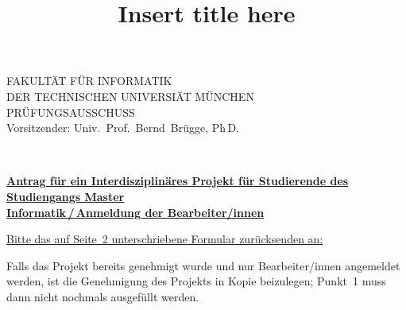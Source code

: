 \documentclass[german,11pt,a4paper]{netforms}
\title{Insert title here}{Titel hier eintragen}
\begin{document}
	\begin{minipage}{.2\textwidth}%
		\centering
	\end{minipage}%
	\begin{minipage}{.6\textwidth}%
		\centering
		\huge\textsc{FAKULT\"AT F\"UR INFORMATIK}\large\\[-.2ex]
		\textsc{DER TECHNISCHEN UNIVERSI\"AT M\"UNCHEN}\\[-.2ex]
		\textsc{PR\"UFUNGSAUSSCHUSS}\\[-.2ex]
		Vorsitzender: Univ.~Prof.~Bernd~Br\"ugge, Ph\,D.
	\end{minipage}%
	\begin{minipage}{.2\textwidth}%
		\centering
	\end{minipage}\\[1ex]

	\begin{center}
		\textbf{%
			\large
			\underline{Antrag f\"ur ein Interdisziplin\"ares Projekt f\"ur
			Studierende des Studiengangs Master}\\[.2ex]
			\underline{Informatik\,/\,Anmeldung der Bearbeiter/innen}
		}
	\end{center}

	\vspace{1ex}
	{%
		\footnotesize
		\underline{Bitte das auf Seite~2 unterschriebene Formular
		zur\"ucksenden an:}
	}

	\vspace{.5ex}
	\hspace{.5ex}

	\vspace{\baselineskip}
	Falls das Projekt bereits genehmigt wurde und nur Bearbeiter/innen
	angemeldet werden, ist die Genehmigung des Projekts in Kopie beizulegen;
	Punkt~1 muss dann nicht nochmals ausgef\"ullt werden.
\end{document}
